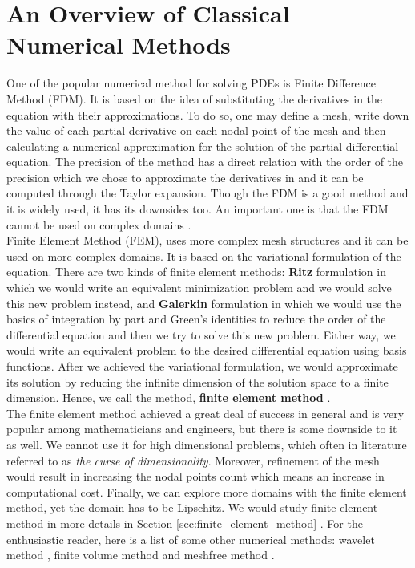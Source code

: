 \section{An Overview of Classical Numerical Methods}
\label{sec:overviewof_FEM_FDM}
One of the popular  numerical method for solving PDEs is  Finite Difference Method (FDM). It is based on the idea of substituting the derivatives in the equation with their approximations. To do so, one may define a mesh, write down the value of each partial derivative on each nodal point of the mesh and then calculating a numerical approximation for the solution of the partial differential equation. The precision of the method has a direct relation with the order of the precision which we chose to approximate the derivatives in and it can be computed through the Taylor expansion. Though the FDM is a good method and it is widely used, it has its downsides too. An important one is that the FDM cannot be used on complex domains \cite{forsythe1960finite, smith1985numerical, morton2005numerical}.\\
Finite Element Method (FEM), uses more complex mesh structures and it can be used on more complex domains. It is based on the variational formulation of the equation. There are two kinds of finite element methods: \textbf{Ritz} formulation in which we would write an equivalent minimization problem and we would solve this new problem instead, and \textbf{Galerkin} formulation in which we would use the basics of integration by part and Green's identities to reduce the order of the differential equation and then we try to solve this new problem. Either way, we would write an equivalent problem to the desired differential equation using basis functions. After we achieved the variational formulation, we would approximate its solution by reducing the infinite dimension of the solution space to a finite dimension. Hence, we call the method, \textbf{finite element method} \cite{suli2012lecture, johnson2012numerical}.\\
The finite element method achieved a great deal of success in general and is very popular among mathematicians and engineers, but there is some downside to it as well. We cannot use it for high dimensional problems, which often in literature referred to as \textit{the curse of dimensionality}. Moreover, refinement of the mesh would result in increasing the nodal points count which means an increase in computational cost. Finally, we can explore more domains with the finite element method, yet the domain has to be Lipschitz. We would study finite element method in more details in Section \eqref{sec:finite_element_method} \cite{zienkiewicz1977finite, cook2007concepts}.
For the enthusiastic reader, here is a list of some other numerical methods: wavelet method \cite{dahmen1997multiscale, lepik2005numerical}, finite volume method \cite{moukalled2016finite, leveque2002finite} and meshfree method \cite{liu2003smoothed, liu2009meshfree}.\\
